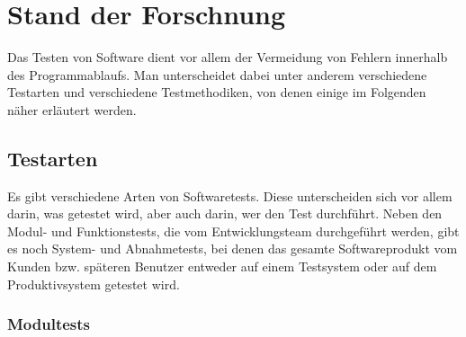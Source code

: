 \section{Stand der Forschnung}

Das Testen von Software dient vor allem der Vermeidung von Fehlern innerhalb des Programmablaufs. Man unterscheidet dabei unter anderem verschiedene Testarten und verschiedene Testmethodiken, von denen einige im Folgenden näher erläutert werden.

\subsection{Testarten}

Es gibt verschiedene Arten von Softwaretests. Diese unterscheiden sich vor allem darin, was getestet wird, aber auch darin, wer den Test durchführt. Neben den Modul- und Funktionstests, die vom Entwicklungsteam durchgeführt werden, gibt es noch System- und Abnahmetests, bei denen das gesamte Softwareprodukt vom Kunden bzw. späteren Benutzer entweder auf einem Testsystem oder auf dem Produktivsystem getestet wird.

\subsubsection{Modultests}

